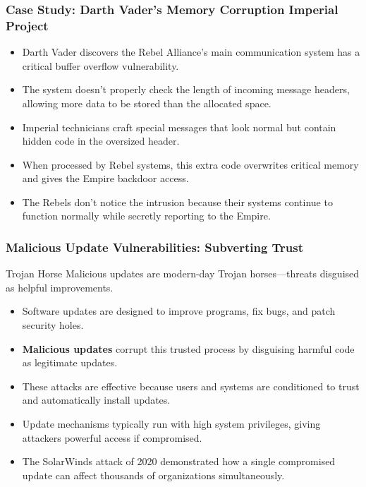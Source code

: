 \documentclass{beamer}
\begin{document}
\begin{frame}
    \frametitle{Case Study: Darth Vader's Memory Corruption Imperial Project}
    
    \begin{itemize}
        \item Darth Vader discovers the Rebel Alliance's main communication system has a critical buffer overflow vulnerability.
        \item The system doesn't properly check the length of incoming message headers, allowing more data to be stored than the allocated space.
        \item Imperial technicians craft special messages that look normal but contain hidden code in the oversized header.
        \item When processed by Rebel systems, this extra code overwrites critical memory and gives the Empire backdoor access.
        \item The Rebels don't notice the intrusion because their systems continue to function normally while secretly reporting to the Empire.
    \end{itemize}
\end{frame}

\begin{frame}
    \frametitle{Malicious Update Vulnerabilities: Subverting Trust}
    
    \begin{block}{Trojan Horse}
        Malicious updates are modern-day Trojan horses—threats disguised as helpful improvements.
    \end{block}
    
    \begin{itemize}
        \item Software updates are designed to improve programs, fix bugs, and patch security holes.
        \item \textbf{Malicious updates} corrupt this trusted process by disguising harmful code as legitimate updates.
        \item These attacks are effective because users and systems are conditioned to trust and automatically install updates.
        \item Update mechanisms typically run with high system privileges, giving attackers powerful access if compromised.
        \item The SolarWinds attack of 2020 demonstrated how a single compromised update can affect thousands of organizations simultaneously.
    \end{itemize}
\end{frame}
\end{document}
